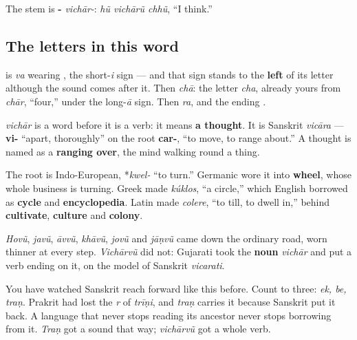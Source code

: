 The stem is \textbf{-} \emph{vichār-}: \emph{hũ vichārũ chhũ}, \textquotedblleft{}I think.\textquotedblright{}

\subsection*{The letters in this word}
\textbf{} is \textbf{} \emph{va} wearing \textbf{}, the short-\emph{i} sign — and that sign stands to the \textbf{left} of its letter although the sound comes after it. Then \emph{chā}: the letter \textbf{} \emph{cha}, already yours from \emph{chār}, \textquotedblleft{}four,\textquotedblright{} under the long-\emph{ā} sign. Then \textbf{} \emph{ra}, and the ending \textbf{}.

\begin{cousinweb}
\textbf{} \emph{vichār} is a word before it is a verb: it means \textbf{a thought}. It is Sanskrit \emph{vicāra} — \textbf{vi-} \textquotedblleft{}apart, thoroughly\textquotedblright{} on the root \textbf{car-}, \textquotedblleft{}to move, to range about.\textquotedblright{} A thought is named as a \textbf{ranging over}, the mind walking round a thing.

The root is Indo-European, *\emph{kwel-} \textquotedblleft{}to turn.\textquotedblright{} Germanic wore it into \textbf{wheel}, whose whole business is turning. Greek made \emph{kúklos}, \textquotedblleft{}a circle,\textquotedblright{} which English borrowed as \textbf{cycle} and \textbf{encyclopedia}. Latin made \emph{colere}, \textquotedblleft{}to till, to dwell in,\textquotedblright{} behind \textbf{cultivate}, \textbf{culture} and \textbf{colony}.
\end{cousinweb}

\begin{grammarlens}[title={What you've built: a verb Gujarati made rather than inherited}]
\emph{Hovũ}, \emph{javũ}, \emph{āvvũ}, \emph{khāvũ}, \emph{jovũ} and \emph{jāṇvũ} came down the ordinary road, worn thinner at every step. \emph{Vichārvũ} did not: Gujarati took the \textbf{noun} \emph{vichār} and put a verb ending on it, on the model of Sanskrit \emph{vicarati}.

You have watched Sanskrit reach forward like this before. Count to three: \emph{ek, be, traṇ}. Prakrit had lost the \emph{r} of \emph{trīṇi}, and \emph{traṇ} carries it because Sanskrit put it back. A language that never stops reading its ancestor never stops borrowing from it. \emph{Traṇ} got a sound that way; \emph{vichārvũ} got a whole verb.
\end{grammarlens}

